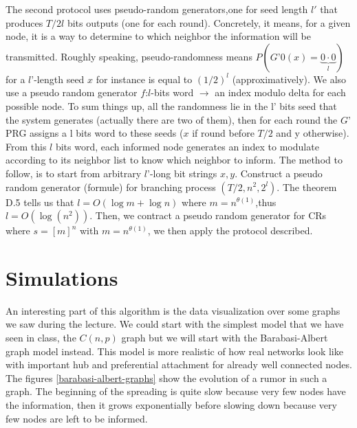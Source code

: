 \documentclass[10pt,journal,a4paper]{IEEEtran}
\begin{document}
The second protocol uses pseudo-random generators,one for seed length $l'$ that produces $T/2 l$ bits outputs (one for each round). Concretely, it means, for a given node, it is a way to determine to which neighbor the information will be transmitted. Roughly speaking, pseudo-randomness means $P(G’0(x)=\underbrace{0\cdot0}_l)$ for a $l’$-length seed $x$ for instance is equal to $(1/2)^l$ (approximatively). We also use a pseudo random generator $f$:$l$-bits word $\to$ an index modulo delta for each possible node. To sum things up, all the randomness lie in the l’ bits seed that the system generates (actually there are two of them), then for each round the $G’$ PRG assigns a l bits word to these seeds ($x$ if round before $T/2$ and y otherwise). From this $l$ bits word, each informed node generates an index to modulate according to its neighbor list to know which neighbor to inform.
 The method to follow, is to start from arbitrary $l’$-long bit strings $x,y$. Construct a pseudo random generator (formule) for branching process $(T/2,n^2,2^l)$. The theorem D.5 tells us that $l=O(\log m+\log n)$ where $m=n^{\theta(1)}$,thus $l=O(\log(n^2))$. Then, we contract a pseudo random generator for CRs where $s=[m]^n$ with $m=n^{\theta(1)}$, we then apply the protocol described.

\section{Simulations}

An interesting part of this algorithm is the data visualization over some graphs we saw during the lecture. We could start with the simplest model that we have seen in class, the $C(n,p)$ graph but we will start with the Barabasi-Albert graph model instead. This model is more realistic of how real networks look like with important hub and preferential attachment for already well connected nodes. The figures \ref{barabasi-albert-graphs} show the evolution of a rumor in such a graph. The beginning of the spreading is quite slow because very few nodes have the information, then it grows exponentially before slowing down because very few nodes are left to be informed. 
\end{document}
